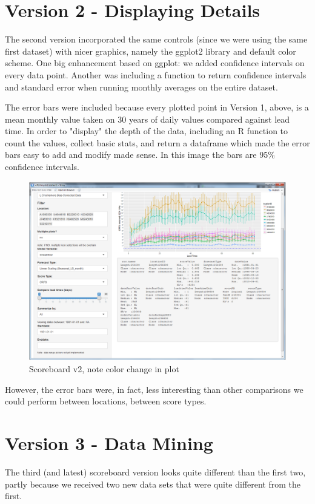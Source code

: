\documentclass[logos,parttoc,morelanguage=french,morelanguage=german,draft]{orsay-memoire}
\begin{document}
\section{Version 2 - Displaying Details}

The second version incorporated the same controls (since we were using the same first dataset) with nicer graphics, namely the  \gls{ggplot2} library and default color scheme. One big enhancement based on ggplot: we added confidence intervals on every data point. Another was including a function to return confidence intervals and standard error when running monthly averages on the entire dataset.

The error bars were included because every plotted point in Version 1, above, is a mean monthly value taken on 30 years of daily values compared against lead time. In order to "display" the depth of the data, including an R function to count the values, collect basic stats, and return a dataframe which made the error bars easy to add and modify made sense. In this image the bars are 95\% confidence intervals.

\begin{figure}[H]
\centering
\includegraphics[width=0.7\linewidth]{images/sbdV2v24notes.png}
  \caption{Scoreboard v2, note color change in plot}
  \label{fig:scoreboard v2}
\end{figure}

However, the error bars were, in fact, less interesting than other comparisons we could perform between locations, between score types.

\section{Version 3 - Data Mining}

The third (and latest) scoreboard version looks quite different than the first two, partly because we received two new data sets that were quite different from the first.
\end{document}
